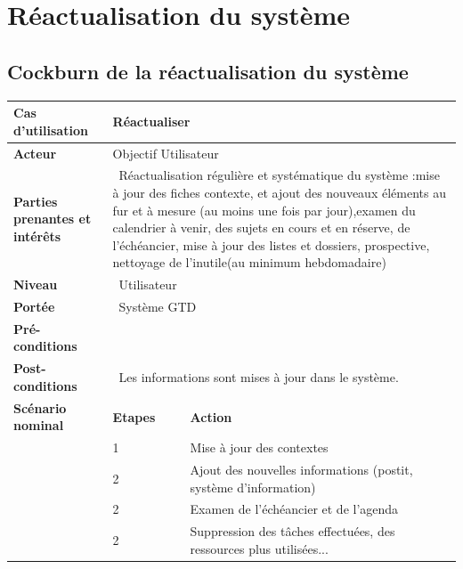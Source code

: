 \section {Réactualisation du système}

\subsection*{Cockburn de la réactualisation du système}
\noindent 


\begin{tabular}{|p{1.1in}|p{1.1in}|p{1.5in}|p{1.5in}|} \hline 
\textbf{Cas d'utilisation }& \multicolumn{3}{|p{1in}|}{\textbf{Réactualiser}} \\ \hline 
\textbf{}\textbf{Acteur} & \multicolumn{3}{|p{3.2in}|}{Objectif Utilisateur} \\ \hline 
\textbf{Parties prenantes et intérêts} & \multicolumn{3}{|p{4in}|}{~Réactualisation régulière et systématique du système :\newline  mise à jour des fiches contexte, et ajout des nouveaux éléments au fur et à mesure (au moins une fois par jour),\newline  examen du calendrier à venir, des sujets en cours et en réserve, de l'échéancier, mise à jour des listes et dossiers, prospective, nettoyage de l'inutile(au minimum hebdomadaire)} \\ \hline 
\textbf{Niveau} & \multicolumn{3}{|p{3.2in}|}{~Utilisateur} \\ \hline 
\textbf{Portée} & \multicolumn{3}{|p{3.2in}|}{~Système GTD} \\ \hline 
\textbf{Pré-conditions} & \multicolumn{3}{|p{3.2in}|}{~} \\ \hline 
\textbf{Post-conditions} & \multicolumn{3}{|p{4in}|}{~Les informations sont mises à jour dans le système.} \\ \hline 
\textbf{Scénario nominal} & \textbf{Etapes} &  \multicolumn{2}{|p{2.5in}|}{\textbf{Action}} \\ \hline 
\textbf{~} & 1  &  \multicolumn{2}{|p{3in}|}{Mise à jour des contextes} \\ \hline 
\textbf{} & 2 & \multicolumn{2}{|p{3in}|}{Ajout des nouvelles informations (postit, système d'information)}  \\ \hline 
\textbf{} & 2 & \multicolumn{2}{|p{3in}|}{Examen de l'échéancier et de l'agenda}  \\ \hline 
\textbf{} & 2 & \multicolumn{2}{|p{3in}|}{Suppression des tâches effectuées, des ressources plus utilisées...}  \\ \hline 

\end{tabular}
